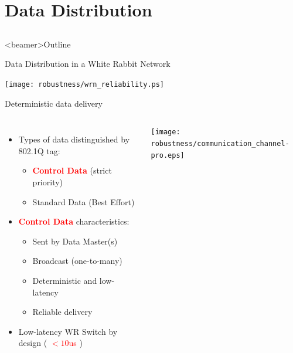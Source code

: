 \documentclass[compress,red]{beamer}
\begin{document}
\section{Data Distribution}
\subsection{}
\begin{frame}<beamer>{Outline}
    \tableofcontents [currentsection]
\end{frame}

\begin{frame}{Data Distribution in a White Rabbit Network }

    \vspace{-0.3cm}

    \begin{center}
    \texttt{[image: robustness/wrn\_reliability.ps]}
    \end{center}
	  
    \vspace{-0.7cm}

\end{frame}

\begin{frame}{Deterministic data delivery}

\begin{columns}[c]
    \begin{itemize}
      \item Types of data distinguished by 802.1Q tag:
	  \begin{itemize}
	    \item \textcolor{red}{\bf Control Data} (strict priority)
	    \item Standard Data (Best Effort)
	  \end{itemize}
	  \item \textcolor{red}{\bf Control Data} characteristics:
	  \begin{itemize}
      \item Sent by Data Master(s)
	    \item Broadcast (one-to-many)
	    \item Deterministic and low-latency
	    \item Reliable delivery
	  \end{itemize}
    \item Low-latency WR Switch by design ( \textcolor{red}{$<10$us} )
    \end{itemize}
    \begin{center}
    \texttt{[image: robustness/communication\_channel-pro.eps]}
    \end{center}

\end{columns}
\end{frame}
\end{document}
